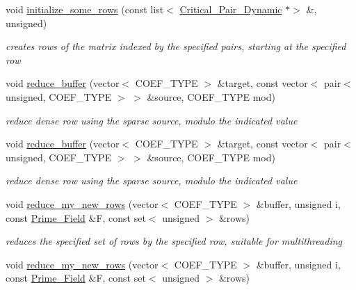 \begin{DoxyCompactItemize}
\mbox{\label{group___g_b_computation_ada3c0b561fefae7da3c28b6f6574cbc0}} 
void \hyperlink{group___g_b_computation_ada3c0b561fefae7da3c28b6f6574cbc0}{initialize\+\_\+some\+\_\+rows} (const list$<$ \hyperlink{group___g_b_computation_class_critical___pair___dynamic}{Critical\+\_\+\+Pair\+\_\+\+Dynamic} $\ast$$>$ \&, unsigned)
\begin{DoxyCompactList}\small\item\em creates rows of the matrix indexed by the specified pairs, starting at the specified row \end{DoxyCompactList}\item 
void \hyperlink{group___g_b_computation_ab24c775b8cfd88daf73a1fbde0b998a8}{reduce\+\_\+buffer} (vector$<$ C\+O\+E\+F\+\_\+\+T\+Y\+PE $>$ \&target, const vector$<$ pair$<$ unsigned, C\+O\+E\+F\+\_\+\+T\+Y\+PE $>$ $>$ \&source, C\+O\+E\+F\+\_\+\+T\+Y\+PE mod)
\begin{DoxyCompactList}\small\item\em reduce dense row using the sparse source, modulo the indicated value \end{DoxyCompactList}\item 
void \hyperlink{group___g_b_computation_ab24c775b8cfd88daf73a1fbde0b998a8}{reduce\+\_\+buffer} (vector$<$ C\+O\+E\+F\+\_\+\+T\+Y\+PE $>$ \&target, const vector$<$ pair$<$ unsigned, C\+O\+E\+F\+\_\+\+T\+Y\+PE $>$ $>$ \&source, C\+O\+E\+F\+\_\+\+T\+Y\+PE mod)
\begin{DoxyCompactList}\small\item\em reduce dense row using the sparse source, modulo the indicated value \end{DoxyCompactList}\item 
void \hyperlink{group___g_b_computation_a76fbaaed7645b0895065bfb13ca7c800}{reduce\+\_\+my\+\_\+new\+\_\+rows} (vector$<$ C\+O\+E\+F\+\_\+\+T\+Y\+PE $>$ \&buffer, unsigned i, const \hyperlink{group___fields_group_class_prime___field}{Prime\+\_\+\+Field} \&F, const set$<$ unsigned $>$ \&rows)
\begin{DoxyCompactList}\small\item\em reduces the specified set of rows by the specified row, suitable for multithreading \end{DoxyCompactList}\item 
void \hyperlink{group___g_b_computation_a76fbaaed7645b0895065bfb13ca7c800}{reduce\+\_\+my\+\_\+new\+\_\+rows} (vector$<$ C\+O\+E\+F\+\_\+\+T\+Y\+PE $>$ \&buffer, unsigned i, const \hyperlink{group___fields_group_class_prime___field}{Prime\+\_\+\+Field} \&F, const set$<$ unsigned $>$ \&rows)
$$
\end{DoxyCompactItemize}
